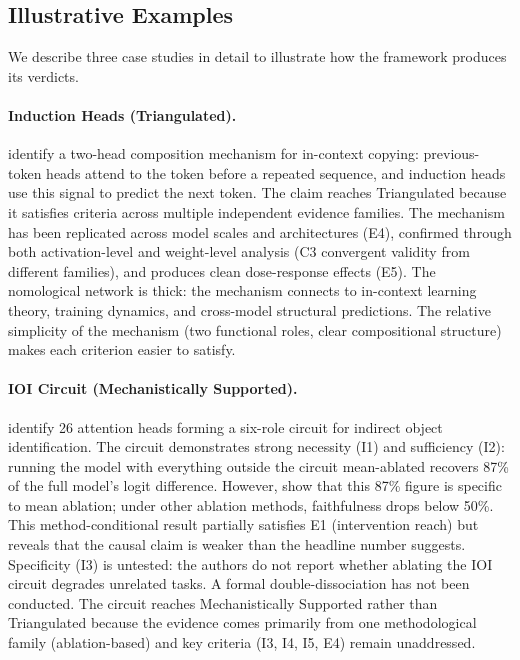 \documentclass[10pt]{article}
\begin{document}
\subsection{Illustrative Examples}

We describe three case studies in detail to illustrate how the framework produces its verdicts.

\paragraph{Induction Heads (Triangulated).} \citet{olsson2022context} identify a two-head composition mechanism for in-context copying: previous-token heads attend to the token before a repeated sequence, and induction heads use this signal to predict the next token. The claim reaches Triangulated because it satisfies criteria across multiple independent evidence families. The mechanism has been replicated across model scales and architectures (E4), confirmed through both activation-level and weight-level analysis (C3 convergent validity from different families), and produces clean dose-response effects (E5). The nomological network is thick: the mechanism connects to in-context learning theory, training dynamics, and cross-model structural predictions. The relative simplicity of the mechanism (two functional roles, clear compositional structure) makes each criterion easier to satisfy.

\paragraph{IOI Circuit (Mechanistically Supported).} \citet{wang2023interpretability} identify 26 attention heads forming a six-role circuit for indirect object identification. The circuit demonstrates strong necessity (I1) and sufficiency (I2): running the model with everything outside the circuit mean-ablated recovers 87\% of the full model's logit difference. However, \citet{miller2024transformer} show that this 87\% figure is specific to mean ablation; under other ablation methods, faithfulness drops below 50\%. This method-conditional result partially satisfies E1 (intervention reach) but reveals that the causal claim is weaker than the headline number suggests. Specificity (I3) is untested: the authors do not report whether ablating the IOI circuit degrades unrelated tasks. A formal double-dissociation has not been conducted. The circuit reaches Mechanistically Supported rather than Triangulated because the evidence comes primarily from one methodological family (ablation-based) and key criteria (I3, I4, I5, E4) remain unaddressed.
\end{document}

